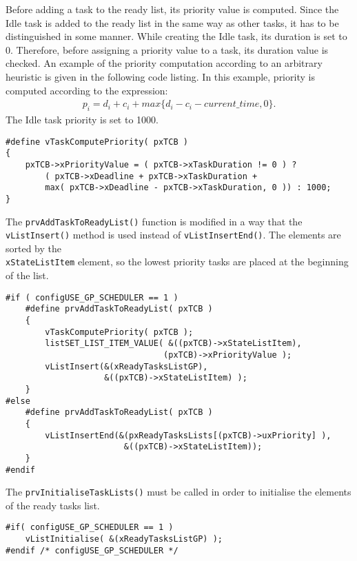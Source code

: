 Before adding a task to the ready list, its priority value is computed. 
Since the Idle task is added to the ready list in the same way as other tasks, it has to be distinguished in some manner. 
While creating the Idle task, its duration is set to 0.
Therefore, before assigning a priority value to a task, its duration value is checked. 
An example of the priority computation according to an arbitrary heuristic is given in the following code listing. 
In this example, priority is computed according to the expression:
\begin{align*}
p_i = d_i + c_i + max\{ d_i - c_i - current\_time, 0 \}.
\end{align*}
The Idle task priority is set to 1000.
\begin{lstlisting}[frame=none, label={ready_list}, caption={Macro function for priority computation.}, captionpos=b]
#define vTaskComputePriority( pxTCB )
{
	pxTCB->xPriorityValue = ( pxTCB->xTaskDuration != 0 ) ? 
		( pxTCB->xDeadline + pxTCB->xTaskDuration + 
		max( pxTCB->xDeadline - pxTCB->xTaskDuration, 0 )) : 1000;
}	
\end{lstlisting}
The \verb$prvAddTaskToReadyList()$ function is modified in a way that the \verb$vListInsert()$ method is used instead of \verb$vListInsertEnd()$. 
The elements are sorted by the \\\verb$xStateListItem$ element, so the lowest priority tasks are placed at the beginning of the list. 
\begin{lstlisting}[frame=none, label={ready_add}, caption={Adding a new task to the ready list.}, captionpos=b]
#if ( configUSE_GP_SCHEDULER == 1 )
	#define prvAddTaskToReadyList( pxTCB )
	{
		vTaskComputePriority( pxTCB );
		listSET_LIST_ITEM_VALUE( &((pxTCB)->xStateListItem), 
								(pxTCB)->xPriorityValue );
		vListInsert(&(xReadyTasksListGP), 
					&((pxTCB)->xStateListItem) );
	}																								
#else 																								
	#define prvAddTaskToReadyList( pxTCB )
	{
		vListInsertEnd(&(pxReadyTasksLists[(pxTCB)->uxPriority] ), 
						&((pxTCB)->xStateListItem));
	}
#endif
\end{lstlisting}
The \verb$prvInitialiseTaskLists()$ must be called in order to initialise the elements of the ready tasks list.
\begin{lstlisting}[frame=none, label={ready_list}, caption={Declaration of the new ready tasks list.}, captionpos=b]
#if( configUSE_GP_SCHEDULER == 1 )
	vListInitialise( &(xReadyTasksListGP) );
#endif /* configUSE_GP_SCHEDULER */
\end{lstlisting}
